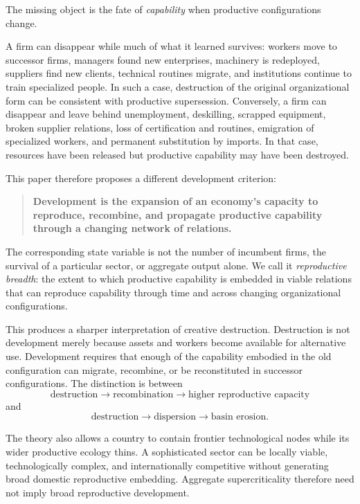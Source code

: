 \documentclass[11pt]{article}
\begin{document}
The missing object is the fate of \emph{capability} when productive configurations change.

A firm can disappear while much of what it learned survives: workers move to successor firms, managers found new enterprises, machinery is redeployed, suppliers find new clients, technical routines migrate, and institutions continue to train specialized people. In such a case, destruction of the original organizational form can be consistent with productive supersession. Conversely, a firm can disappear and leave behind unemployment, deskilling, scrapped equipment, broken supplier relations, loss of certification and routines, emigration of specialized workers, and permanent substitution by imports. In that case, resources have been released but productive capability may have been destroyed.

This paper therefore proposes a different development criterion:

\begin{quote}
\textbf{Development is the expansion of an economy's capacity to reproduce, recombine, and propagate productive capability through a changing network of relations.}
\end{quote}

The corresponding state variable is not the number of incumbent firms, the survival of a particular sector, or aggregate output alone. We call it \emph{reproductive breadth}: the extent to which productive capability is embedded in viable relations that can reproduce capability through time and across changing organizational configurations.

This produces a sharper interpretation of creative destruction. Destruction is not development merely because assets and workers become available for alternative use. Development requires that enough of the capability embodied in the old configuration can migrate, recombine, or be reconstituted in successor configurations. The distinction is between
\[
\text{destruction} \rightarrow \text{recombination} \rightarrow \text{higher reproductive capacity}
\]
and
\[
\text{destruction} \rightarrow \text{dispersion} \rightarrow \text{basin erosion}.
\]

The theory also allows a country to contain frontier technological nodes while its wider productive ecology thins. A sophisticated sector can be locally viable, technologically complex, and internationally competitive without generating broad domestic reproductive embedding. Aggregate supercriticality therefore need not imply broad reproductive development.
\end{document}

